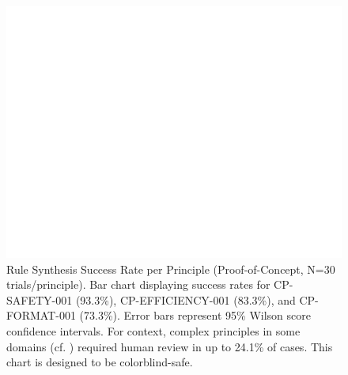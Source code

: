 \documentclass[manuscript,screen,review,anonymous,9pt]{acmart}
\begin{document}
\begin{figure}[htbp]
\centering
\includegraphics[width=\linewidth,keepaspectratio]{Figure_3_Rule_Synthesis_Success_Rate_per_Principle.png} %
\caption[Rule synthesis success rate bar chart]{Rule Synthesis Success Rate per Principle (Proof-of-Concept, N=30 trials/principle). Bar chart displaying success rates for CP-SAFETY-001 (93.3\%), CP-EFFICIENCY-001 (83.3\%), and CP-FORMAT-001 (73.3\%). Error bars represent 95\% Wilson score confidence intervals. For context, complex principles in some domains (cf. ) required human review in up to 24.1\% of cases. This chart is designed to be colorblind-safe.}
\label{fig:rule_synthesis_chart}
\end{figure}
\end{document}
